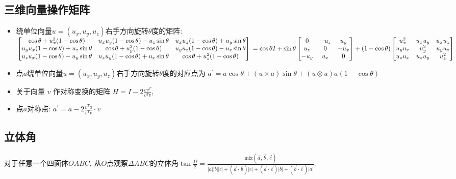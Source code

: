 \documentclass[landscape, twocolumn, 8pt, a4paper, twoside]{extarticle}
\begin{document}
  \subsection{三维向量操作矩阵}
  \begin{itemize}
  \item 绕单位向量$u = (u_x, u_y, u_z)$右手方向旋转$\theta$度的矩阵: \\
    $
    \begin{bmatrix}
      \cos\theta + u_x^2 (1 - \cos\theta)    &    u_x u_y (1 - \cos\theta) - u_z \sin\theta    &    u_x u_z (1 - \cos\theta) + u_y \sin\theta \\
    u_y u_x (1 - \cos\theta) + u_z \sin\theta    &    \cos\theta + u_y^2 (1 - \cos\theta)    &    u_y u_z (1 - \cos\theta) - u_x \sin\theta \\
    u_z u_x (1 - \cos\theta) - u_y \sin\theta    &    u_z u_y (1 - \cos\theta) + u_x \sin\theta    &    \cos\theta + u_z^2 (1 - \cos\theta)
  \end{bmatrix} \\
  = \cos\theta I
  + \sin\theta
  \begin{bmatrix}
    0    &    -u_z    &    u_y \\
    u_z    &    0    &    -u_x \\
    -u_y    &    u_x    &    0
  \end{bmatrix}
  + (1 - \cos\theta)
  \begin{bmatrix}
    u_x ^ 2    &    u_x u_y    &    u_x u_z \\
    u_y u_x    &    u_y ^ 2    &    u_y u_z \\
    u_z u_x    &    u_z u_y    &    u_z ^ 2
  \end{bmatrix}
  $
  \item 点$a$绕单位向量$u = (u_x, u_y, u_z)$右手方向旋转$\theta$度的对应点为
  $a^\prime = a \cos\theta + (u \times a) \sin\theta + (u \otimes u) a (1 - \cos\theta)$
  \item 关于向量 $v$ 作对称变换的矩阵 $H = I - 2 \frac{v v^T}{v^T v}$,
  \item 点$a$对称点: $a^\prime = a - 2 \frac{v^T a}{v^T v} \cdot v$
  \end{itemize}
  \subsection{立体角}
  对于任意一个四面体$OABC$,
  从$O$点观察$\Delta ABC$的立体角$\tan{\frac{\Omega}{2}} = 
  \frac{\textrm{mix}(\overrightarrow{a}, \overrightarrow{b}, \overrightarrow{c}) }{
  |a||b||c|
  + (\overrightarrow{a} \cdot \overrightarrow{b}) |c|
  + (\overrightarrow{a} \cdot \overrightarrow{c}) |b|
  + (\overrightarrow{b} \cdot \overrightarrow{c}) |a|
}$.
\end{document}
